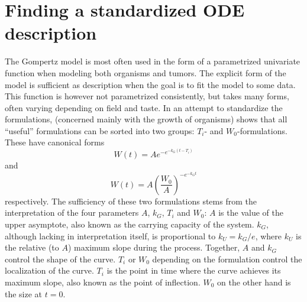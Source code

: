 \section{Finding a standardized ODE description}

The Gompertz model is most often used in the form of a parametrized univariate function when modeling both organisms and tumors.
The explicit form of the model is sufficient as description when the goal is to fit the model to some data.
This function is however not parametrized consistently, but takes many forms, often varying depending on field and taste.
In an attempt to standardize the formulations, \cite{tjorve2017gompertz} (concerned mainly with the growth of organisms) shows that all \enquote{useful} formulations can be sorted into two groups: \(T_i\)- and \(W_0\)-formulations.
These have canonical forms
\begin{equation} \label{eq:gompertz-ti-function}
  W(t) = A e^{-e^{-k_G(t-T_i)}}
\end{equation}
and
\begin{equation} \label{eq:gompertz-w0-function}
  W(t) = A \left(\frac{W_0}{A}\right)^{-e^{-k_G t}}
\end{equation}
respectively.
The sufficiency of these two formulations stems from the interpretation of the four parameters \(A\), \(k_G\), \(T_i\) and \(W_0\):
\(A\) is the value of the upper asymptote, also known as the carrying capacity of the system.
\(k_G\), although lacking in interpretation itself, is proportional to \(k_U = k_G / e\), where \(k_U\) is the relative (to \(A\)) maximum slope during the process.
Together, \(A\) and \(k_G\) control the shape of the curve.
\(T_i\) or \(W_0\) depending on the formulation control the localization of the curve.
\(T_i\) is the point in time where the curve achieves its maximum slope, also known as the point of inflection.
\(W_0\) on the other hand is the size at \(t=0\).

